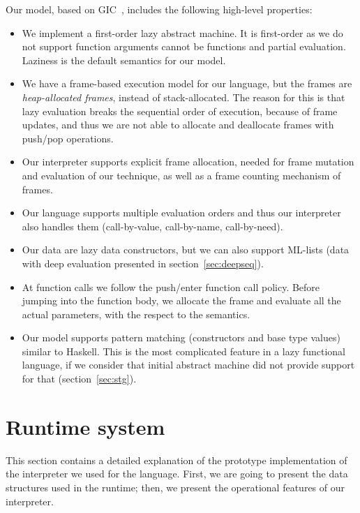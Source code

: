 \documentclass[diploma]{softlab-thesis}
\begin{document}
Our model, based on GIC~\cite{Fourtounis14,Theofilopoulos13}, 
includes the following high-level properties:
\begin{itemize}
  \item We implement a first-order lazy abstract machine. It is first-order as we do not support
  function arguments cannot be functions and partial evaluation. Laziness is the default semantics
  for our model.
  \item We have a frame-based execution model for our language, but the frames are 
  \textit{heap-allocated frames}, instead of stack-allocated. The reason for this is that lazy evaluation 
  breaks the sequential order of execution, because of frame updates, and thus we are not able 
  to allocate and deallocate frames with push/pop operations.
  \item Our interpreter supports explicit frame allocation, needed for frame mutation and evaluation 
  of our technique, as well as a frame counting mechanism of frames.
  \item Our language supports multiple evaluation orders and thus our interpreter 
  also handles them (call-by-value, call-by-name, call-by-need).
  \item Our data are lazy data constructors, but we can also support ML-lists (data with deep evaluation
  presented in section~\ref{sec:deepseq}).
  \item At function calls we follow the push/enter function call policy. Before jumping into 
  the function body, we allocate the frame and evaluate all the actual parameters, with the respect
  to the semantics. 
  \item Our model supports pattern matching (constructors and base type values) similar to Haskell. 
  This is the most complicated feature in a lazy functional language, if we consider that initial 
  abstract machine did not provide support for that (section~\ref{sec:stg}).
\end{itemize}

\section {Runtime system}
\label{sec:runtime-system}

This section contains a detailed explanation of the prototype implementation of the interpreter we 
used for the language. First, we are going to present the data structures used in the runtime; then, 
we present the operational features of our interpreter. 
\end{document}
